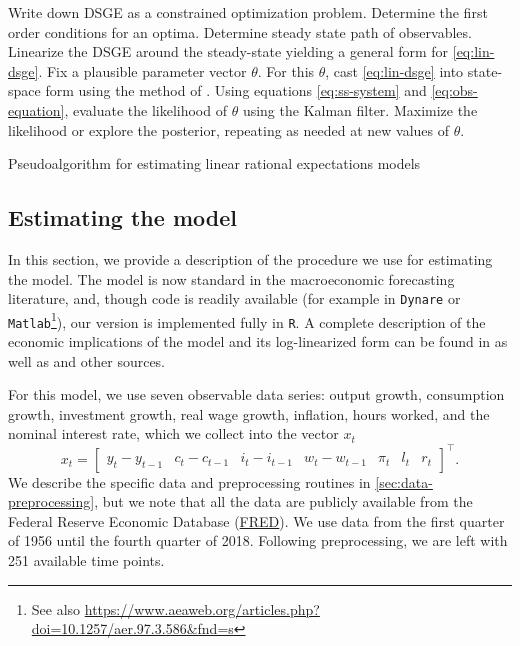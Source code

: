 \documentclass[11pt]{article}
\begin{document}
\begin{algorithm}[t]
\begin{algorithmic}[1]
  \State Write down DSGE as a constrained optimization problem.
  \State Determine the first order conditions for an optima.
  \State Determine steady state path of observables.
  \State Linearize the DSGE around the steady-state yielding a general
    form for \eqref{eq:lin-dsge}.
    \State Fix a plausible parameter vector $\theta$.
    \State For this $\theta$, cast \eqref{eq:lin-dsge} into state-space form
      using the method of \citet{Sims2002}.
    \State Using equations \eqref{eq:ss-system} and \eqref{eq:obs-equation}, evaluate the
      likelihood of $\theta$ using the Kalman filter.
    \State Maximize the likelihood or explore the posterior, repeating
      as needed at new values of $\theta$.
    \EndProcedure
  \end{algorithmic}
  \caption{Pseudoalgorithm for estimating linear rational expectations models}
  \label{alg:solveRE}
\end{algorithm}

\subsection{Estimating the \citet{SmetsWouters2007} model}
\label{sec:estim-sw-model}

In this section, we provide a description of the procedure we use for
estimating the \citet{SmetsWouters2007} model. The model is now standard
in the macroeconomic forecasting literature, and, though code is readily
available (for example in \texttt{Dynare} or
\texttt{Matlab}\footnote{See also
  \url{https://www.aeaweb.org/articles.php?doi=10.1257/aer.97.3.586&fnd=s}}),
our version is implemented fully in \texttt{R}. A complete description
of the economic implications of the model and its log-linearized form
can be found in \citet{SmetsWouters2007} as well as \citet{Iskrev2009}
and other sources.

For this model, we use seven observable data series: output growth,
consumption growth, investment growth, real wage growth, inflation,
hours worked, and the nominal interest rate, which we collect into the
vector \(x_t\) \begin{equation}
  x_t = \begin{bmatrix} y_t-y_{t-1} & c_t - c_{t-1} & i_t-i_{t-1} &
    w_t-w_{t-1} & \pi_t & l_t & r_t \end{bmatrix}^\top.
\end{equation} We describe the specific data and preprocessing routines
in \autoref{sec:data-preprocessing}, but we note that all the data are
publicly available from the Federal Reserve Economic Database
(\href{http://research.stlouisfed.org/fred2/}{FRED}). We use data from
the first quarter of 1956 until the fourth quarter of 2018. Following
preprocessing, we are left with 251 available time points.
\end{document}
